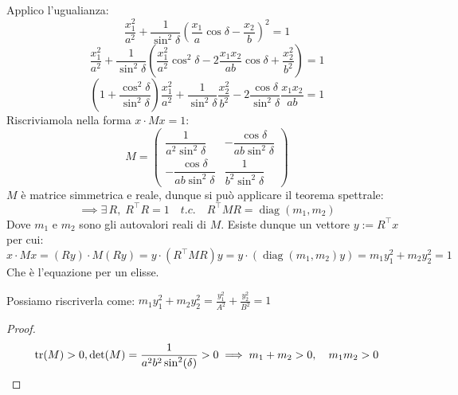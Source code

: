 Applico l'ugualianza:
\begin{equation*}
    \frac{x_1^2}{a^2} + \frac{1}{\sin^2\delta}
      \left( \frac{x_1}{a}\cos\delta - \frac{x_2}{b} \right)^2= 1
\end{equation*}
\begin{equation*}
    \frac{x_1^2}{a^2} + \frac{1}{\sin^2\delta}
    \left( \frac{x_1^2}{a^2}\cos^2\delta - 2\frac{x_1 x_2}{a b}\cos\delta + \frac{x_2^2}{b^2} \right) = 1
\end{equation*}
\begin{equation}
    \left( 1 + \frac{\cos^2\delta}{\sin^2\delta} \right) \frac{x_1^2}{a^2}
    + \frac{1}{\sin^2\delta}\frac{x_2^2}{b^2}- 2\frac{\cos\delta}{\sin^2\delta}\frac{x_1 x_2}{a b} = 1
\end{equation}
Riscriviamola nella forma $x\cdot Mx = 1$:
\begin{equation}
    M = 
    \begin{pmatrix}
        \dfrac{1}{a^2 \sin^2 \delta} & -\dfrac{\cos \delta}{a b \sin^2 \delta} \\[1.2ex]
        -\dfrac{\cos \delta}{a b \sin^2 \delta} & \dfrac{1}{b^2 \sin^2 \delta}
    \end{pmatrix}
\end{equation}
$M$ è matrice simmetrica e reale, dunque si può applicare il teorema spettrale:
\begin{equation}
    \implies \exists\,R, \;R^\intercal R = 1 \quad t.c. \quad R^\intercal MR = \operatorname{diag} (m_1,m_2)
\end{equation}
Dove $m_1$ e $m_2$ sono gli autovalori reali di $M$. Esiste dunque un vettore $y:= R^\intercal x$ per cui:
\begin{equation}
    x\cdot Mx= (Ry)\cdot M(Ry)= y\cdot(R^\intercal MR)y= y\cdot \left( \operatorname{diag} (m_1,m_2) y\right)= m_1 y_1^2+m_2y_2^2=1
\end{equation}
Che è l'equazione per un elisse.
\begin{remark}
    Possiamo riscriverla come: $m_1 y_1^2+m_2y_2^2=\frac{y_1^2}{A^2}+\frac{y_2^2}{B^2}= 1$
\end{remark}
\begin{proof}
    \begin{equation*}
       \tr(M )>0, \det(M ) = \frac{1}{a^2b^2\sin[2](\delta)}>0\implies m_1+m_2>0, \quad m_1m_2>0 
    \end{equation*}
\end{proof}

